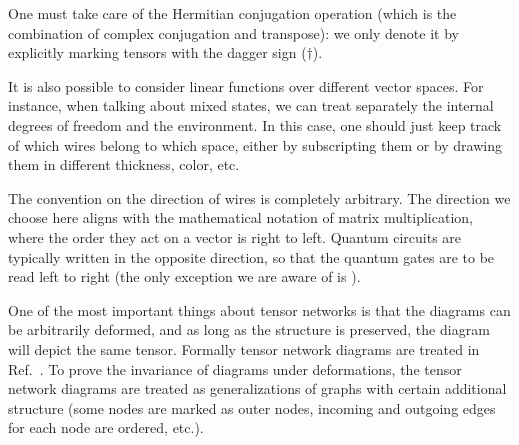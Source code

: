







One must take care of the Hermitian conjugation operation (which is the combination of complex conjugation and transpose): we only denote it by explicitly marking tensors with the dagger sign ($\dagger$). 

It is also possible to consider linear functions over different vector spaces. For instance, when talking about mixed states, we can treat separately the internal degrees of freedom and the environment. In this case, one should just keep track of which wires belong to which space, either by subscripting them or by drawing them in different thickness, color, etc.

The convention on the direction of wires is completely arbitrary. The direction we choose here aligns with the mathematical notation of matrix multiplication, where the order they act on a vector is right to left. Quantum circuits are typically written in the opposite direction, so that the quantum gates are to be read left to right (the only exception we are aware of is \cite{kitaev_classical_2002}).

One of the most important things about tensor networks is that the diagrams can be arbitrarily deformed, and as long as the structure is preserved, the diagram will depict the same tensor. Formally tensor network diagrams are treated in Ref.~\cite{joyal_geometry_1991}. To prove the invariance of diagrams under deformations, the tensor network diagrams are treated as generalizations of graphs with certain additional structure (some nodes are marked as outer nodes, incoming and outgoing edges for each node are ordered, etc.).


